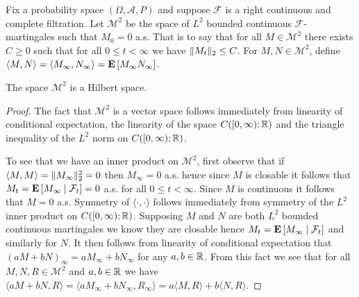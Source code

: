 \begin{defn}Fix a probability space $(\Omega, \mathcal{A}, P)$ and suppose $\mathcal{F}$ is a right continuous and complete filtration.  Let $\mathcal{M}^2$ be the space of $L^2$ bounded continuous $\mathcal{F}$-martingales such that $M_0 = 0$ a.s.  That is to say that for all $M \in \mathcal{M}^2$ there exists $C \geq 0$ such that for all $0 \leq t < \infty$ we have $\norm{M_t}_2 \leq C$.  For $M, N \in \mathcal{M}^2$, define $\langle M, N \rangle = \langle M_\infty, N_\infty \rangle = \expectation{M_\infty N_\infty }$.
\end{defn}
\begin{lem}\label{ContinuousL2MartingalesHilbert}The space $\mathcal{M}^2$ is a Hilbert space.
\end{lem}
\begin{proof}
The fact that $\mathcal{M}^2$ is a vector space follows immediately from linearity of conditional expectation, the linearity of the space $C([0,\infty); \reals)$ and the triangle inequality of the $L^2$ norm on $C([0,\infty); \reals)$. 
 
To  see that we have an inner product on $\mathcal{M}^2$, first observe that if $\langle M, M \rangle = \norm{M_\infty}^2_2 = 0$ then $M_\infty = 0$ a.s. hence since $M$ is closable it follows that $M_t = \cexpectationlong{\mathcal{F}_t}{M_\infty} = 0$ a.s.  for all $0 \leq t < \infty$.  Since $M$ is continuous it follows that $M=0$ a.s.  Symmetry of $\langle \cdot,\cdot \rangle$ follows immediately from symmetry of the $L^2$ inner product on $C([0,\infty); \reals)$.  Supposing $M$ and $N$ are both $L^2$ bounded continuous martingales we know they are closable hence $M_t = \cexpectationlong{\mathcal{F}_t}{M_\infty}$ and similarly for $N$.  It then follows from linearity of conditional expectation that $(aM + bN)_\infty = aM_\infty + bN_\infty$ for any $a,b \in \reals$.  From this fact we see that  for all $M,N,R \in \mathcal{M}^2$ and $a,b \in \reals$ we have $\langle aM + bN, R \rangle = \langle aM_\infty + bN_\infty, R_\infty \rangle = a \langle M, R \rangle + b \langle N, R \rangle$. 


\end{proof}
